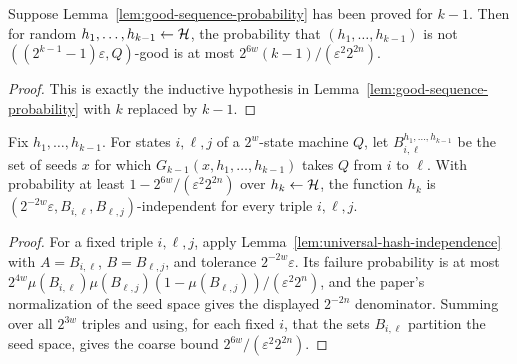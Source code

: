 \begin{lemma}
  \label{lem:bad-event-one}
  Suppose Lemma~\ref{lem:good-sequence-probability} has been proved for
  $k-1$. Then for random $h_1,\ldots,h_{k-1}\leftarrow\mathcal{H}$, the probability
  that $(h_1,\ldots,h_{k-1})$ is not
  $((2^{k-1}-1)\varepsilon,Q)$-good is at most
  $2^{6w}(k-1)/(\varepsilon^2 2^{2n})$.
\end{lemma}
\begin{proof}
  This is exactly the inductive hypothesis in Lemma~\ref{lem:good-sequence-probability}
  with $k$ replaced by $k-1$.
\end{proof}

\begin{lemma}
  \label{lem:bad-event-two}
  Fix $h_1,\ldots,h_{k-1}$. For states $i,\ell,j$ of a $2^w$-state machine
  $Q$, let $B_{i,\ell}^{h_1,\ldots,h_{k-1}}$ be the set of seeds $x$ for which
  $G_{k-1}(x,h_1,\ldots,h_{k-1})$ takes $Q$ from $i$ to $\ell$. With
  probability at least $1-2^{6w}/(\varepsilon^2 2^{2n})$ over
  $h_k\leftarrow\mathcal{H}$, the function $h_k$ is
  $(2^{-2w}\varepsilon,B_{i,\ell},B_{\ell,j})$-independent for every triple
  $i,\ell,j$.
\end{lemma}
\begin{proof}
  For a fixed triple $i,\ell,j$, apply
  Lemma~\ref{lem:universal-hash-independence} with
  $A=B_{i,\ell}$, $B=B_{\ell,j}$, and tolerance $2^{-2w}\varepsilon$. Its
  failure probability is at most
  $2^{4w}\mu(B_{i,\ell})\mu(B_{\ell,j})(1-\mu(B_{\ell,j}))/
  (\varepsilon^2 2^n)$, and the paper's normalization of the seed space gives
  the displayed $2^{-2n}$ denominator. Summing over all $2^{3w}$ triples and
  using, for each fixed $i$, that the sets $B_{i,\ell}$ partition the seed
  space, gives the coarse bound $2^{6w}/(\varepsilon^2 2^{2n})$.
\end{proof}

